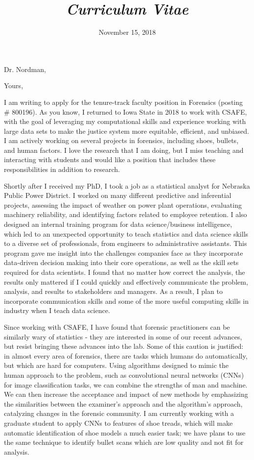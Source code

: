 \documentclass[12pt, letterpaper, sans]{moderncv}
\title{\emph{Curriculum Vitae}}
\begin{document}
\date{November 15, 2018}
\opening{Dr. Nordman,}
\closing{Yours,}
\makelettertitle

I am writing to apply for the tenure-track faculty position in Forensics (posting \# 800196). As you know, I returned to Iowa State in 2018 to work with CSAFE, with the goal of leveraging my computational skills and experience working with large data sets to make the justice system more equitable, efficient, and unbiased. I am actively working on several projects in forensics, including shoes, bullets, and human factors. I love the research that I am doing, but I miss teaching and interacting with students and would like a position that includes these responsibilities in addition to research. 

Shortly after I received my PhD, I took a job as a statistical analyst for Nebraska Public Power District. I worked on many different predictive and inferential projects, assessing the impact of weather on power plant operations, evaluating machinery reliability, and identifying factors related to employee retention. I also designed an internal training program for data science/business intelligence, which led to an unexpected opportunity to teach statistics and data science skills to a diverse set of professionals, from engineers to administrative assistants. This program gave me insight into the challenges companies face as they incorporate data-driven decision making into their core operations, as well as the skill sets required for data scientists. I found that no matter how correct the analysis, the results only mattered if I could quickly and effectively communicate the problem, analysis, and results to stakeholders and managers. As a result, I plan to incorporate communication skills and some of the more useful computing skills in industry when I teach data science.

Since working with CSAFE, I have found that forensic practitioners can be similarly wary of statistics - they are interested in some of our recent advances, but resist bringing these advances into the lab. Some of this caution is justified: in almost every area of forensics, there are tasks which humans do automatically, but which are hard for computers. Using algorithms designed to mimic the human approach to the problem, such as convolutional neural networks (CNNs) for image classification tasks, we can combine the strengths of man and machine. We can then increase the acceptance and impact of new methods by emphasizing the similarities between the examiner's approach and the algorithm's approach, catalyzing changes in the forensic community. I am currently working with a graduate student to apply CNNs to features of shoe treads, which will make automatic identification of shoe models a much easier task; we have plans to use the same technique to identify bullet scans which are low quality and not fit for analysis.
\end{document}
